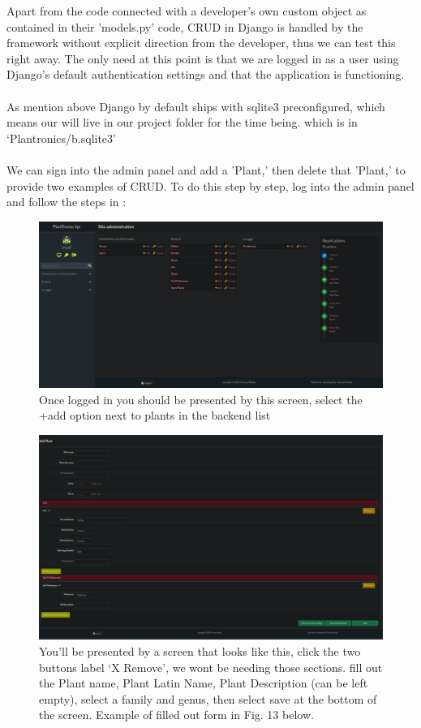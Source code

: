 \documentclass{article}
\begin{document}
        Apart from the code connected with a developer's own custom object as contained in their 'models.py' code, CRUD in Django is handled by the framework without explicit direction from the developer, thus we can test this right away. The only need at this point is that we are logged in as a user using Django's default authentication settings and that the application is functioning.
        \\
        \\
        As mention above Django by default ships with sqlite3 preconfigured, which means our will live in our project folder for the time being. which is in `Plantronics/b.sqlite3'
        \\
        \\
        We can sign into the admin panel and add a 'Plant,' then delete that 'Plant,' to provide two examples of CRUD. To do this step by step, log into the admin panel and follow the steps in :
        \newpage
        \begin{figure}[!htb]
            \centering
            \caption{Once logged in you should be presented by this screen, select the +add option next to plants in the backend list}
            \includegraphics[scale=0.3]{crud1}
        \end{figure}
    
        \begin{figure}[!htb]
            \centering
            \caption{You'll be presented by a screen that looks like this, click the two buttons label `X Remove', we wont be needing those sections. fill out the Plant name, Plant Latin Name, Plant Description (can be left empty), select a family and genus, then select save at the bottom of the screen. Example of filled out form in Fig. 13 below.}
            \includegraphics[scale=0.38]{crud2}
        \end{figure}
    
\end{document}

